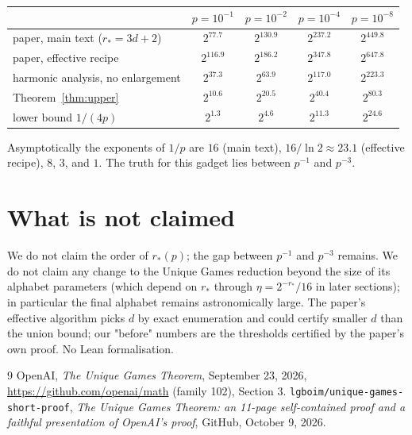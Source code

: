 \documentclass[11pt]{amsart}
\theoremstyle{remark}
\begin{document}
\begin{center}
\begin{tabular}{lcccc}
\toprule
& $p=10^{-1}$ & $p=10^{-2}$ & $p=10^{-4}$ & $p=10^{-8}$\\
\midrule
paper, main text ($r_*=3d+2$) & $2^{77.7}$ & $2^{130.9}$ & $2^{237.2}$ & $2^{449.8}$\\
paper, effective recipe & $2^{116.9}$ & $2^{186.2}$ & $2^{347.8}$ & $2^{647.8}$\\
harmonic analysis, no enlargement & $2^{37.3}$ & $2^{63.9}$ & $2^{117.0}$ & $2^{223.3}$\\
Theorem~\ref{thm:upper} & $2^{10.6}$ & $2^{20.5}$ & $2^{40.4}$ & $2^{80.3}$\\
lower bound $1/(4p)$ & $2^{1.3}$ & $2^{4.6}$ & $2^{11.3}$ & $2^{24.6}$\\
\bottomrule
\end{tabular}
\end{center}
Asymptotically the exponents of $1/p$ are $16$ (main text), $16/\ln2\approx23.1$ (effective recipe),
$8$, $3$, and $1$. The truth for this gadget lies between $p^{-1}$ and $p^{-3}$.

\section*{What is not claimed}
We do not claim the order of $r_*(p)$; the gap between $p^{-1}$ and $p^{-3}$ remains. We do not
claim any change to the Unique Games reduction beyond the size of its alphabet parameters (which
depend on $r_*$ through $\eta=2^{-r_*}/16$ in later sections); in particular the final alphabet remains
astronomically large. The paper's effective algorithm picks $d$ by exact enumeration and could
certify smaller $d$ than the union bound; our "before" numbers are the thresholds certified by the
paper's own proof. No Lean formalisation.

\begin{thebibliography}{9}
 OpenAI, \emph{The Unique Games Theorem}, September 23, 2026,
\url{https://github.com/openai/math} (family 102), Section 3.
 \texttt{lgboim/unique-games-short-proof}, \emph{The Unique Games Theorem: an 11-page
self-contained proof and a faithful presentation of OpenAI's proof}, GitHub, October 9, 2026.
\end{thebibliography}
\end{document}
